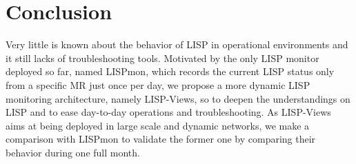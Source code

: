 \section{Conclusion}
\label{sec:lispviews_conclusion}

Very little is known about the behavior of LISP in operational environments and it still lacks of troubleshooting tools. Motivated by the only LISP monitor deployed so far, named LISPmon, which records the current LISP status only from a specific MR just once per day, we propose a more dynamic LISP monitoring architecture, namely LISP-Views, so to deepen the understandings on LISP and to ease day-to-day operations and troubleshooting. As LISP-Views aims at being deployed in large scale and dynamic networks, we make a comparison with LISPmon to validate the former one by comparing their behavior during one full month.

